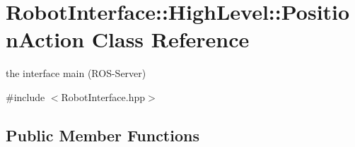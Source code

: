 \hypertarget{classRobotInterface_1_1HighLevel_1_1PositionAction}{}\section{Robot\+Interface\+:\+:High\+Level\+:\+:Position\+Action Class Reference}
\label{classRobotInterface_1_1HighLevel_1_1PositionAction}


the interface \textquotesingle{}main\textquotesingle{} (R\+O\+S-\/\+Server)  




{\ttfamily \#include $<$Robot\+Interface.\+hpp$>$}

\subsection*{Public Member Functions}
